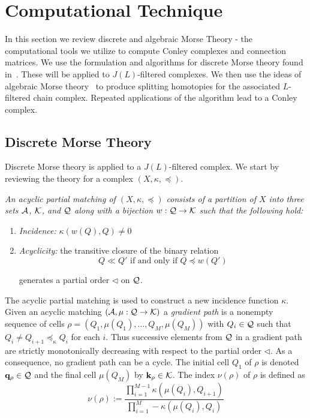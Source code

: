 


\section{Computational Technique}\label{sec:computation}

In this section we review discrete and algebraic Morse Theory - the computational tools we utilize to compute Conley complexes and connection matrices.    We use the formulation and algorithms for discrete Morse theory found in~\cite{focm}.  These will be applied to $J(L)$-filtered complexes.    We then use the ideas of algebraic Morse theory~\cite{sko} to produce splitting homotopies for the associated $L$-filtered chain complex.  Repeated applications of the algorithm lead to a Conley complex.


 \subsection{Discrete Morse Theory}
 
 Discrete Morse theory is applied to a $J(L)$-filtered complex.  We start by reviewing the theory for a complex $(X,\kappa,\preceq)$.  
 
 \begin{defn}
 {\em
 An {\em acyclic partial matching} of $(X,\kappa,\preceq)$ consists of a partition of $X$ into three sets ${\mathcal A}$, ${\mathcal K}$, and ${\mathcal Q}$ along with a bijection $w:{\mathcal Q}\to {\mathcal K}$ such that the following hold:
 \begin{enumerate}
 \item {\em Incidence:} $\kappa(w(Q),Q)\neq 0$
 
 \item {\em Acyclicity:} the transitive closure of the binary relation $$Q \ll Q' \text{ if and only if } Q \preceq w(Q')$$
 
 generates a partial order $\lhd$ on ${\mathcal Q}$.
 \end{enumerate}
 }
 \end{defn} 

The acyclic partial matching is used to construct a new incidence function $\kappa$.  Given an acyclic matching $({\mathcal A},\mu:{\mathcal Q}\to {\mathcal K})$ a {\em gradient path} is a nonempty sequence of cells $\rho = (Q_1,\mu(Q_1),\ldots, Q_M,\mu(Q_M))$ with $Q_i\in {\mathcal Q}$ such that $Q_i\neq Q_{i+1}\preceq_\kappa Q_i$ for each $i$.  Thus successive elements from ${\mathcal Q}$ in a gradient path are strictly monotonically decreasing with respect to the partial order $\lhd$.  As a consequence, no gradient path can be a cycle.  The initial cell $Q_1$ of $\rho$ is denoted ${\bf q}_\rho\in {\mathcal Q}$ and the final cell $\mu(Q_M)$ by ${\bf k}_\rho \in {\mathcal K}$.  The index $\nu(\rho)$ of $\rho$ is defined as $$\nu(\rho):= \frac{\prod_{i=1}^{M-1} \kappa(\mu(Q_i),Q_{i+1})}{\prod_{i=1}^{M} -\kappa(\mu(Q_i),Q_i) }$$

